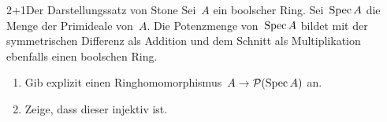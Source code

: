 \documentclass[entwurf]{uebblatt}
\begin{document}
\begin{aufgabe}{2+1}{Der Darstellungssatz von Stone}
Sei~$A$ ein boolscher Ring. Sei~$\operatorname{Spec} A$ die Menge der Primideale von~$A$. Die
Potenzmenge von~$\operatorname{Spec} A$ bildet mit der symmetrischen Differenz als Addition
und dem Schnitt als Multiplikation ebenfalls einen boolschen Ring.
\begin{enumerate}
\item Gib explizit einen Ringhomomorphismus~$A \to \mathcal{P}(\operatorname{Spec} A)$ an.
\item Zeige, dass dieser injektiv ist.
\end{enumerate}
\end{aufgabe}
\end{document}

